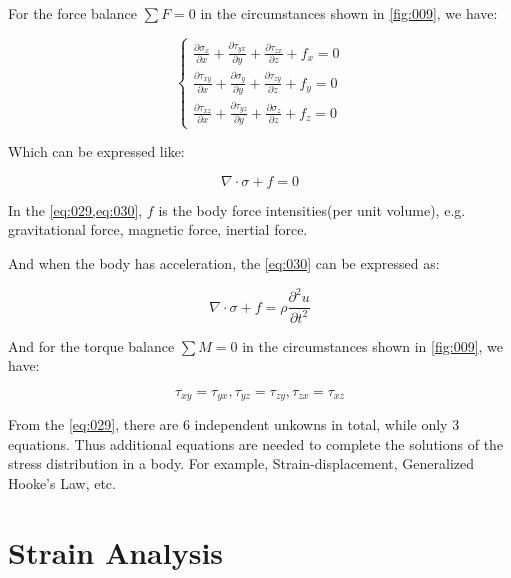 \documentclass[en,hazy,cyan,8pt,normal]{elegantnote}
\numberwithin{equation}{section}
\begin{document}
    For the force balance $\sum F=0$ in the circumstances shown in \cref{fig:009}, we have:

    \begin{equation}\label{eq:029}
      \left\{
      \begin{aligned}
        \displaystyle \frac{\partial\sigma_x}{\partial x}+\frac{\partial\tau_{yx}}{\partial y}+\frac{\partial\tau_{zx}}{\partial z}+f_x=0 \\
        \displaystyle \frac{\partial\tau_{xy}}{\partial x}+\frac{\partial\sigma_y}{\partial y}+\frac{\partial\tau_{zy}}{\partial z}+f_y=0 \\
        \displaystyle \frac{\partial\tau_{xz}}{\partial x}+\frac{\partial\tau_{yz}}{\partial y}+\frac{\partial\sigma_z}{\partial z}+f_z=0
      \end{aligned}
      \right.
    \end{equation}

    Which can be expressed like:

    \begin{equation}\label{eq:030}
      \nabla \cdot \sigma + f = 0
    \end{equation}

    In the \cref{eq:029,eq:030}, $f$ is the body force intensities(per unit volume), e.g. gravitational force, magnetic force, inertial force.

    And when the body has acceleration, the \cref{eq:030} can be expressed as:

    \begin{equation}\label{eq:031}
      \nabla \cdot \sigma + f = \rho \frac{\partial^2 u}{\partial t^2}
    \end{equation}

    And for the torque balance $\sum M=0$ in the circumstances shown in \cref{fig:009}, we have:

    \begin{equation}\label{eq:032}
        \tau_{xy}=\tau_{yx}, \tau_{yz}=\tau_{zy}, \tau_{zx}=\tau_{xz}
    \end{equation}

    From the \cref{eq:029}, there are 6 independent unkowns in total, while only 3 equations. Thus additional equations are needed to complete the solutions of the stress distribution in a body. For example, Strain-displacement, Generalized Hooke's Law, etc.

\section{Strain Analysis}
\end{document}
